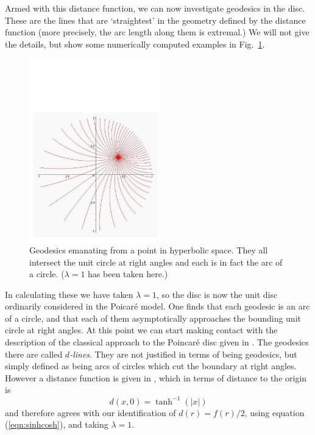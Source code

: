 Armed with this distance function, we can now investigate
geodesics in the disc. These are the lines that are `straightest'
in the geometry defined by the distance function (more precisely,
the arc length along them is extremal.) We will not give the
details, but show some numerically computed examples in
Fig.~\ref{fig:hyper-geos}.
%
\begin{figure} \label{fig:hyper-geos}
\centerline{\includegraphics[width=0.5\textwidth]{hyper_geos}}
\caption{Geodesics emanating from a point in hyperbolic space.
They all intersect the unit circle at right angles and each is in
fact the arc of a circle. ($\lambda=1$ has been taken here.) }
\end{figure}
%
In calculating these we have taken $\lambda=1$, so the disc is now
the unit disc ordinarily considered in the Poicar\'e model. One
finds that each geodesic is an arc of a circle, and that each of
them asymptotically approaches the bounding unit circle at right
angles. At this point we can start making contact with the
description of the classical approach to the Poincar\'e disc given
in \cite{GEOM:brannan}. The geodesics there are called {\em $d$-lines}.
They are not justified in terms of being geodesics, but simply
defined as being arcs of circles which cut the boundary at right
angles. However a distance function is given in \cite{GEOM:brannan}, which
in terms of distance to the origin is
%
\begin{equation}
d(x,0) = \tanh^{-1}(|x|)
\end{equation}
%
and therefore agrees with our identification of $d(r)=
f(r)/2$, using equation (\ref{eqn:sinhcosh}), and
taking $\lambda=1$.

